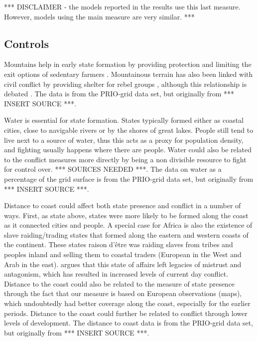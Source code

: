 \documentclass[12pt]{article}
\begin{document}
*** DISCLAIMER - the models reported in the results use this last measure.
However, models using the main measure are very similar. *** 

\subsection{Controls}

Mountains help in early state formation by providing protection and limiting the
exit options of sedentary farmers \citep{Carneiro1988}. Mountainous terrain has
also been linked with civil conflict by providing shelter for rebel groups
\citep{Hegre2006}, although this relationship is debated 
\citep{Buhaug2002}. The data is from the PRIO-grid data set, but originally 
from *** INSERT SOURCE ***.

Water is essential for state formation. States typically formed either as
coastal cities, close to navigable rivers or by the shores of great lakes.
People still tend to live next to a source of water, thus this acts as a proxy
for population density, and fighting usually happens where there are people.
Water could also be related to the conflict measures more directly by being a
non divisible resource to fight for control over. *** SOURCES NEEDED ***. The
data on water as a percentage of the grid surface is from the PRIO-grid data
set, but originally from *** INSERT SOURCE ***.

Distance to coast could affect both state presence and conflict in a number of
ways. First, as state above, states were more likely to be formed along the
coast as it connected cities and people. A special case for Africa is also the
existence of slave raiding/trading states that formed along the eastern and
western coasts of the continent. These states raison d'être was raiding slaves
from tribes and peoples inland and selling them to coastal traders (European in
the West and Arab in the east). \citet{Nunn2008} argues that this state of
affairs left legacies of mistrust and antagonism, which has resulted in
increased levels of current day conflict. Distance to the coast could also be
related to the measure of state presence through the fact that our measure is
based on European observations (maps), which undoubtedly had better coverage
along the coast, especially for the earlier periods. Distance to the coast could
further be related to conflict through lower levels of development. The distance
to coast data is from the PRIO-grid data set, but originally from *** INSERT
SOURCE ***.
\end{document}
